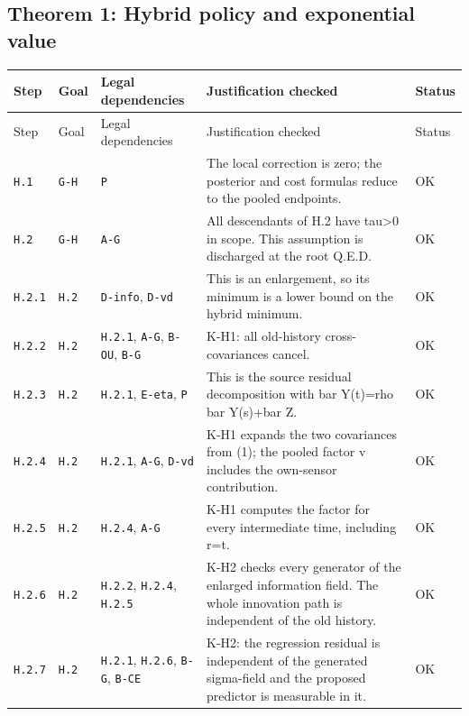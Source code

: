 \documentclass[11pt,letterpaper]{article}
\begin{document}
{\subsection{Theorem 1: Hybrid policy and exponential value}
\begin{longtable}{>{\raggedright\arraybackslash}p{.10\linewidth}>{\raggedright\arraybackslash}p{.08\linewidth}>{\raggedright\arraybackslash}p{.19\linewidth}>{\raggedright\arraybackslash}p{.46\linewidth}>{\raggedright\arraybackslash}p{.08\linewidth}}
\toprule
Step & Goal & Legal dependencies & Justification checked & Status \\
\midrule\endfirsthead
\toprule
Step & Goal & Legal dependencies & Justification checked & Status \\
\midrule\endhead
\bottomrule\endfoot
\texttt{H.1} & \texttt{G-H} & \texttt{P} & The local correction is zero; the posterior and cost formulas reduce to the pooled endpoints. & OK \\[3pt]
\texttt{H.2} & \texttt{G-H} & \texttt{A-G} & All descendants of H.2 have tau>0 in scope. This assumption is discharged at the root Q.E.D. & OK \\[3pt]
\texttt{H.2.1} & \texttt{H.2} & \texttt{D-info}, \texttt{D-vd} & This is an enlargement, so its minimum is a lower bound on the hybrid minimum. & OK \\[3pt]
\texttt{H.2.2} & \texttt{H.2} & \texttt{H.2.1}, \texttt{A-G}, \texttt{B-OU}, \texttt{B-G} & K-H1: all old-history cross-covariances cancel. & OK \\[3pt]
\texttt{H.2.3} & \texttt{H.2} & \texttt{H.2.1}, \texttt{E-eta}, \texttt{P} & This is the source residual decomposition with bar Y(t)=rho bar Y(s)+bar Z. & OK \\[3pt]
\texttt{H.2.4} & \texttt{H.2} & \texttt{H.2.1}, \texttt{A-G}, \texttt{D-vd} & K-H1 expands the two covariances from (1); the pooled factor v includes the own-sensor contribution. & OK \\[3pt]
\texttt{H.2.5} & \texttt{H.2} & \texttt{H.2.4}, \texttt{A-G} & K-H1 computes the factor for every intermediate time, including r=t. & OK \\[3pt]
\texttt{H.2.6} & \texttt{H.2} & \texttt{H.2.2}, \texttt{H.2.4}, \texttt{H.2.5} & K-H2 checks every generator of the enlarged information field. The whole innovation path is independent of the old history. & OK \\[3pt]
\texttt{H.2.7} & \texttt{H.2} & \texttt{H.2.1}, \texttt{H.2.6}, \texttt{B-G}, \texttt{B-CE} & K-H2: the regression residual is independent of the generated sigma-field and the proposed predictor is measurable in it. & OK \\[3pt]

\end{longtable}}
\end{document}
